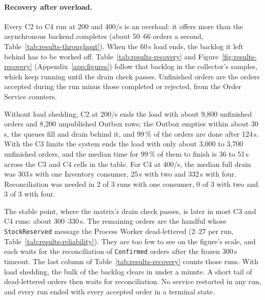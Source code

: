 \documentclass[a4paper]{report}
\begin{document}
\paragraph{Recovery after overload.} Every C2 to C4 run at 200 and 400/s is an
overload: it offers more than the asynchronous backend completes (about 50--66
orders a second, Table~\ref{tab:results-throughput}). When the 60\,s load ends,
the backlog it left behind has to be worked off. Table~\ref{tab:results-recovery}
and Figure~\ref{fig:results-recovery} (Appendix~\ref{app:figures}) follow that backlog in the collector's
samples, which keep running until the drain check passes. Unfinished orders
are the orders accepted during the run minus those completed or rejected,
from the Order Service counters.

Without load shedding, C2 at 200/s ends the load with about 9,800 unfinished
orders and 8,200 unpublished Outbox rows; the Outbox empties within about
30\,s, the queues fill and drain behind it, and 99\,\% of the orders are done
after 124\,s. With the C3 limits the system ends the load with only about
3,000 to 3,700 unfinished orders, and the median time for 99\,\% of them to
finish is 36 to 51\,s across the C3 and C4 cells in the table. For C4 at
400/s, the median full drain was 303\,s with one Inventory consumer, 25\,s
with two and 332\,s with four. Reconciliation was needed in 2 of 3 runs
with one consumer, 0 of 3 with two and 3 of 3 with four.

The stable point, where the matrix's drain check passes, is later in most C3
and C4 runs: about 300--330\,s. The remaining orders are the handful whose
\texttt{StockReserved} message the Process Worker dead-lettered (2--27 per
run, Table~\ref{tab:results-reliability}). They are too few to see on the
figure's scale, and each waits for the reconciliation of
\texttt{Confirmed} orders after the frozen 300\,s timeout. The last column of
Table~\ref{tab:results-recovery} counts those runs. With load shedding, the
bulk of the backlog clears in under a minute. A short tail of dead-lettered
orders then waits for reconciliation. No
service restarted in any run, and every run ended with every accepted order
in a terminal state.
\end{document}
